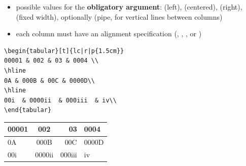 \begin{frame}[fragile]

\begin{itemize}
	\item possible values for the \textbf{obligatory argument}:  (left),  (centered),  (right),  (fixed width), optionally \ltxterm{|} (pipe, for vertical lines between columns)
	
	\item each column must have an alignment specification (\ie {}, , , or )
	
\end{itemize}


\begin{multicols}{2}

{\scriptsize
\begin{lstlisting}
\begin{tabular}[t]{lc|r|p{1.5cm}}
00001 & 002 & 03 & 0004 \\
\hline
0A & 000B & 00C & 0000D\\
\hline
00i  & 0000ii  & 000iii  & iv\\
\end{tabular}
\end{lstlisting}
}

\columnbreak

\begin{tabular}[t]{lc|r|p{1.5cm}}
	00001 & 002 & 03 & 0004 \\
	\hline
	0A & 000B & 00C & 0000D\\
	\hline
	00i  & 0000ii  & 000iii  & iv\\
\end{tabular}
\end{multicols}

\end{frame}


